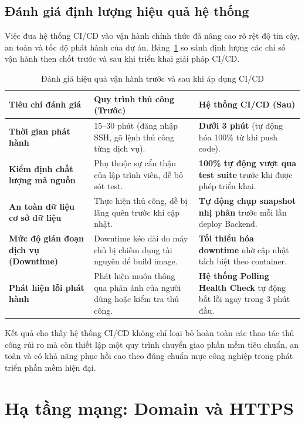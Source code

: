 \subsection{Đánh giá định lượng hiệu quả hệ thống}

Việc đưa hệ thống CI/CD vào vận hành chính thức đã nâng cao rõ rệt độ tin cậy, an toàn và tốc độ phát hành của dự án. Bảng~\ref{tab:cicd_evaluation} so sánh định lượng các chỉ số vận hành then chốt trước và sau khi triển khai giải pháp CI/CD.

\begin{table}[htbp]
\centering
\small
\caption{Đánh giá hiệu quả vận hành trước và sau khi áp dụng CI/CD}
\label{tab:cicd_evaluation}
\renewcommand{\arraystretch}{1.3}
\begin{tabularx}{\textwidth}{|p{3.5cm}|p{4.8cm}|X|}
\hline
\textbf{Tiêu chí đánh giá} & \textbf{Quy trình thủ công (Trước)} & \textbf{Hệ thống CI/CD (Sau)} \\
\hline
\textbf{Thời gian phát hành} &
15--30 phút (đăng nhập SSH, gõ lệnh thủ công từng dịch vụ). &
\textbf{Dưới 3 phút} (tự động hóa 100\% từ khi push code). \\
\hline
\textbf{Kiểm định chất lượng mã nguồn} &
Phụ thuộc sự cẩn thận của lập trình viên, dễ bỏ sót test. &
\textbf{100\% tự động vượt qua test suite} trước khi được phép triển khai. \\
\hline
\textbf{An toàn dữ liệu cơ sở dữ liệu} &
Thực hiện thủ công, dễ bị lãng quên trước khi cập nhật. &
\textbf{Tự động chụp snapshot nhị phân} trước mỗi lần deploy Backend. \\
\hline
\textbf{Mức độ gián đoạn dịch vụ (Downtime)} &
Downtime kéo dài do máy chủ bị chiếm dụng tài nguyên để build image. &
\textbf{Tối thiểu hóa downtime} nhờ cập nhật tách biệt theo container. \\
\hline
\textbf{Phát hiện lỗi phát hành} &
Phát hiện muộn thông qua phản ánh của người dùng hoặc kiểm tra thủ công. &
\textbf{Hệ thống Polling Health Check} tự động bắt lỗi ngay trong 3 phút đầu. \\
\hline
\end{tabularx}
\end{table}

\noindent Kết quả cho thấy hệ thống CI/CD không chỉ loại bỏ hoàn toàn các thao tác thủ công rủi ro mà còn thiết lập một quy trình chuyển giao phần mềm tiêu chuẩn, an toàn và có khả năng phục hồi cao theo đúng chuẩn mực công nghiệp trong phát triển phần mềm hiện đại.

\section{Hạ tầng mạng: Domain và HTTPS}

